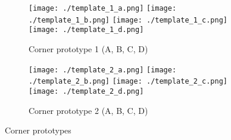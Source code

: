 %
%
%
%
%
%
%
%
%

\begin{figure}[h]
	\centering

	\begin{subfigure}{0.45\textwidth}
		\centering
		\begin{minipage}{\textwidth}
			\texttt{[image: ./template\_1\_a.png]}
			\texttt{[image: ./template\_1\_b.png]}
			\texttt{[image: ./template\_1\_c.png]}
			\texttt{[image: ./template\_1\_d.png]}
		\end{minipage}
		\caption{Corner prototype 1 (A, B, C, D)}
	\end{subfigure}
	\hfill
	\begin{subfigure}{0.45\textwidth}
		\centering
		\begin{minipage}{\textwidth}
			\texttt{[image: ./template\_2\_a.png]}
			\texttt{[image: ./template\_2\_b.png]}
			\texttt{[image: ./template\_2\_c.png]}
			\texttt{[image: ./template\_2\_d.png]}
		\end{minipage}
		\caption{Corner prototype 2 (A, B, C, D)}
	\end{subfigure}

	\caption{Corner prototypes \citep{geigerAutomaticCameraRange2012}}
	\label{fig:corner_prototypes}
\end{figure}

